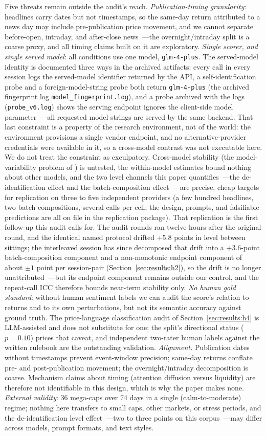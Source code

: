 Five threats remain outside the audit's reach. \emph{Publication-timing granularity}: headlines carry dates but not timestamps, so the same-day return attributed to a news day may include pre-publication price movement, and we cannot separate before-open, intraday, and after-close news~---the overnight/intraday split is a coarse proxy, and all timing claims built on it are exploratory. \emph{Single scorer, and single served model}: all conditions use one model, \texttt{glm-4-plus}. The served-model identity is documented three ways in the archived artifacts: every call in every session logs the served-model identifier returned by the API, a self-identification probe and a foreign-model-string probe both return \texttt{glm-4-plus} (the archived fingerprint log \texttt{model\_fingerprint.log}), and a probe archived with the logs (\texttt{probe\_v6.log}) shows the serving endpoint ignores the client-side model parameter~---all requested model strings are served by the same backend. That last constraint is a property of the research environment, not of the world: the environment provisions a single vendor endpoint, and no alternative-provider credentials were available in it, so a cross-model contrast was not executable here. We do not treat the constraint as exculpatory. Cross-model stability (the model-variability problem of \citealp{herrera2025}) is untested, the within-model estimates bound nothing about other models, and the two level channels this paper quantifies~---the de-identification effect and the batch-composition effect~---are precise, cheap targets for replication on three to five independent providers (a few hundred headlines, two batch compositions, several calls per cell; the design, prompts, and falsifiable predictions are all on file in the replication package). That replication is the first follow-up this audit calls for. The audit rounds ran twelve hours after the original round, and the identical named protocol drifted $+5.8$ points in level between sittings; the interleaved session has since decomposed that drift into a $+3.6$-point batch-composition component and a non-monotonic endpoint component of about $\pm1$ point per session-pair (Section~\ref{sec:results:h2}), so the drift is no longer unattributed~---but its endpoint component remains outside our control, and the repeat-call ICC therefore bounds near-term stability only. \emph{No human gold standard}: without human sentiment labels we can audit the score's relation to returns and to its own perturbations, but not its semantic accuracy against ground truth. The price-language classification audit of Section~\ref{sec:results:h4} is LLM-assisted and does not substitute for one; the split's directional status ($p=0.10$) prices that caveat, and independent two-rater human labels against the written rulebook are the outstanding validation. \emph{Alignment.} Publication dates without timestamps prevent event-window precision; same-day returns conflate pre- and post-publication movement; the overnight/intraday decomposition is coarse. Mechanism claims about timing (attention diffusion versus liquidity) are therefore not identifiable in this design, which is why the paper makes none. \emph{External validity}: 36 mega-caps over 74 days in a single (calm-to-moderate) regime; nothing here transfers to small caps, other markets, or stress periods, and the de-identification level effect~---two to three points on this corpus~---may differ across models, prompt formats, and text styles.
